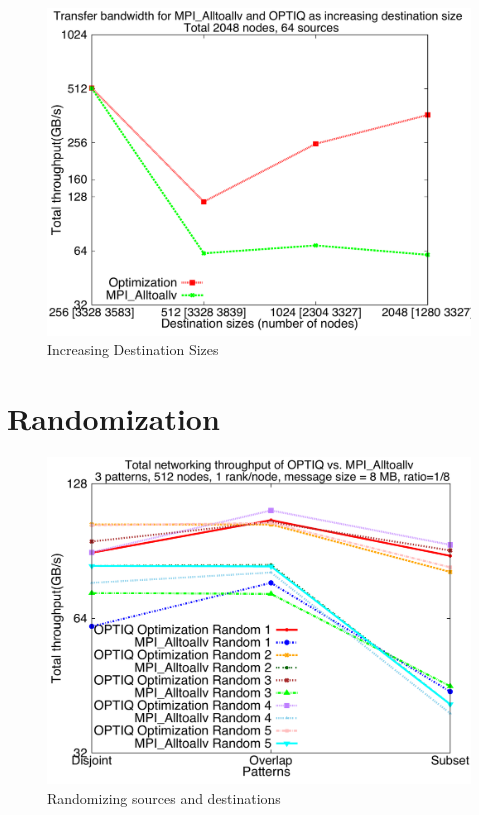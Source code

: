 \documentclass[letter]{article}
\begin{document}
\begin{figure}[h]
\vspace{-0.1in}
\centering
\includegraphics[scale=0.40]{report_figures/incrsize/incrsize_4k.pdf}
\vspace{-0.1in}
\caption{Increasing Destination Sizes}
\vspace{-0.1in}
\label{fig:incrsize_4k}
\end{figure}

\clearpage
\newpage






\clearpage
\newpage

\section{Randomization}

\begin{figure}[h]
\vspace{-0.1in}
\centering
\includegraphics[scale=0.40]{report_figures/rand_opt_mpi.pdf}
\vspace{-0.1in}
\caption{Randomizing sources and destinations}
\vspace{-0.1in}
\label{fig:random}
\end{figure}
\end{document}
